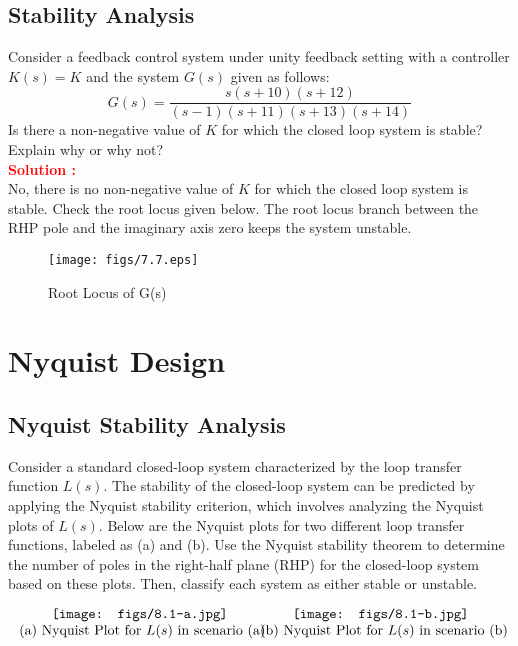 \documentclass[12pt]{article}
\begin{document}
\subsection{Stability Analysis}

Consider a feedback control system under unity feedback setting with a controller $K(s)=K$ and the system $G(s)$ given as follows:
\[
G(s)=\frac{s(s+10)(s+12)}{(s-1)(s+11)(s+13)(s+14)}
\]
Is there a non-negative value of $K$ for which the closed loop system is stable? Explain why or why not?\\

\textbf{\textcolor{red}{Solution :}} \\
No, there is no non-negative value of $K$ for which the closed loop system is stable. Check the root locus given below. The root locus branch between the RHP pole and the imaginary axis zero keeps the system unstable. 

\begin{figure}[h!]
    \centering
    \texttt{[image: figs/7.7.eps]}
    \caption{Root Locus of G(s)}
    \label{fig:prb46}
\end{figure}
\clearpage

\section{Nyquist Design}
\subsection{Nyquist Stability Analysis}

Consider a standard closed-loop system characterized by the loop transfer function $L(s)$. The stability of the closed-loop system can be predicted by applying the Nyquist stability criterion, which involves analyzing the Nyquist plots of $L(s)$. Below are the Nyquist plots for two different loop transfer functions, labeled as (a) and (b). Use the Nyquist stability theorem to determine the number of poles in the right-half plane (RHP) for the closed-loop system based on these plots. Then, classify each system as either stable or unstable.

\[
\begin{minipage}{0.5\textwidth}
\texttt{[image: figs/8.1-a.jpg]}
\centering
\text{(a) Nyquist Plot for $L(s)$ in scenario (a)}
\end{minipage}%
\begin{minipage}{0.5\textwidth}
\texttt{[image: figs/8.1-b.jpg]}
\centering
\text{(b) Nyquist Plot for $L(s)$ in scenario (b)}
\end{minipage}
\]
\end{document}
